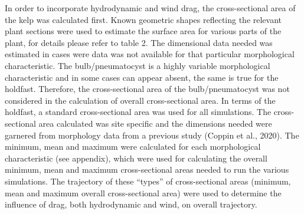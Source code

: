 \documentclass[
]{article}
\begin{document}
In order to incorporate hydrodynamic and wind drag, the cross-sectional
area of the kelp was calculated first. Known geometric shapes reflecting
the relevant plant sections were used to estimate the surface area for
various parts of the plant, for details please refer to table 2. The
dimensional data needed was estimated in cases were data was not
available for that particular morphological characteristic. The
bulb/pneumatocyst is a highly variable morphological characteristic and
in some cases can appear absent, the same is true for the holdfast.
Therefore, the cross-sectional area of the bulb/pneumatocyst was not
considered in the calculation of overall cross-sectional area. In terms
of the holdfast, a standard cross-sectional area was used for all
simulations. The cross-sectional area calculated was site specific and
the dimensions needed were garnered from morphology data from a previous
study (Coppin et al., 2020). The minimum, mean and maximum were
calculated for each morphological characteristic (see appendix), which
were used for calculating the overall minimum, mean and maximum
cross-sectional areas needed to run the various simulations. The
trajectory of these ``types'' of cross-sectional areas (minimum, mean
and maximum overall cross-sectional area) were used to determine the
influence of drag, both hydrodynamic and wind, on overall trajectory.

\providecommand{\docline}[3]{\noalign{\global\setlength{\arrayrulewidth}{#1}}\arrayrulecolor[HTML]{#2}\cline{#3}}

\setlength{\tabcolsep}{8pt}

\renewcommand*{\arraystretch}{1.5}
\end{document}
